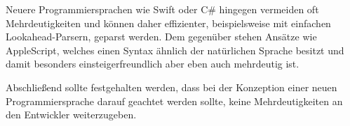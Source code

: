 \documentclass[runningheads]{llncs}
\begin{document}
	Neuere Programmiersprachen wie Swift oder C# hingegen vermeiden oft Mehrdeutigkeiten
	und können daher effizienter, beispielsweise mit einfachen Lookahead-Parsern, geparst werden.
	Dem gegenüber stehen Ansätze wie AppleScript,
	welches einen Syntax ähnlich der natürlichen Sprache besitzt
	und damit besonders einsteigerfreundlich aber eben auch mehrdeutig ist.

	Abschließend sollte festgehalten werden, dass bei der Konzeption einer neuen Programmiersprache
	darauf geachtet werden sollte, keine Mehrdeutigkeiten an den Entwickler weiterzugeben.

%
%
%


	\nocite{*}
	
	
\end{document}

